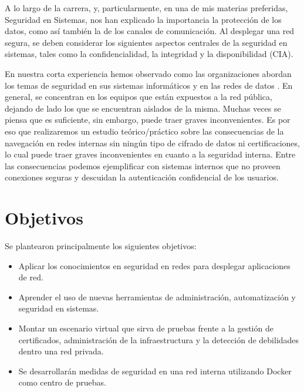 %


A lo largo de la carrera, y, particularmente, en una de mis materias preferidas,  
Seguridad en Sistemas, nos han explicado la importancia la protección de los 
datos, como así también la de los canales de comunicación. Al desplegar 
una red segura, se deben considerar los siguientes aspectos centrales de la 
seguridad en sistemas, tales como la confidencialidad, la integridad y la disponibilidad 
(CIA). 

En nuestra corta experiencia hemos observado como las organizaciones 
abordan los temas de seguridad en sus sistemas informáticos y en las redes de 
datos . En general, se 
concentran en los equipos que están expuestos a la red pública, dejando de 
lado los que se encuentran aislados de la misma. Muchas veces 
se piensa que es suficiente, sin embargo, puede traer graves inconvenientes. 
Es por eso que realizaremos un estudio teórico/práctico sobre las consecuencias 
de la navegación en redes internas sin ningún tipo de cifrado de datos ni 
certificaciones, lo cual puede traer graves inconvenientes en cuanto a la 
seguridad interna. Entre las consecuencias podemos ejemplificar con sistemas 
internos que no proveen conexiones seguras y descuidan la autenticación 
confidencial de los usuarios.


\section{Objetivos}

\noindent Se plantearon principalmente los siguientes objetivos:
\begin{itemize}
    \setlength\itemsep{-0.6em}
    \item Aplicar los conocimientos en seguridad en redes para desplegar aplicaciones de red.
    \item Aprender el uso de nuevas herramientas de administración, automatización y seguridad en sistemas.
    \item Montar un escenario virtual que sirva de pruebas frente a la gestión de certificados, 
    administración de la infraestructura y la detección de debilidades dentro una red privada.
    \item Se desarrollarán medidas de seguridad en una red interna utilizando Docker como centro de 
    pruebas.
\end{itemize}


